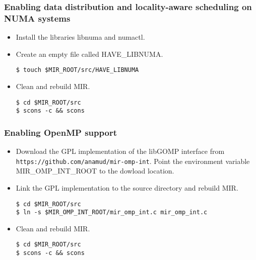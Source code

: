 \documentclass[11pt,a4paper]{article}
\begin{document}
\subsubsection{Enabling data distribution and locality-aware scheduling on NUMA systems}\label{enabling-data-distribution-and-locality-aware-scheduling-on-numa-systems}

\begin{itemize}
    \item Install the libraries libnuma and numactl.
    \item Create an empty file called HAVE\_LIBNUMA.

\begin{lstlisting}[style=MyInputStyle]
$ touch $MIR_ROOT/src/HAVE_LIBNUMA
\end{lstlisting}

    \item Clean and rebuild MIR.

\begin{lstlisting}[style=MyInputStyle]
$ cd $MIR_ROOT/src
$ scons -c && scons
\end{lstlisting}
\end{itemize}

\subsubsection{Enabling OpenMP support}\label{enable-omp-support}

\begin{itemize}
    \item Download the GPL implementation of the libGOMP interface from \texttt{https://github.com/anamud/mir-omp-int}.  Point the environment variable MIR\_OMP\_INT\_ROOT to the dowload location.

\item Link the GPL implementation to the source directory and rebuild MIR.

\begin{lstlisting}[style=MyInputStyle]
$ cd $MIR_ROOT/src
$ ln -s $MIR_OMP_INT_ROOT/mir_omp_int.c mir_omp_int.c
\end{lstlisting}

\item Clean and rebuild MIR.

\begin{lstlisting}[style=MyInputStyle]
$ cd $MIR_ROOT/src
$ scons -c && scons
\end{lstlisting}
\end{itemize}
\end{document}
